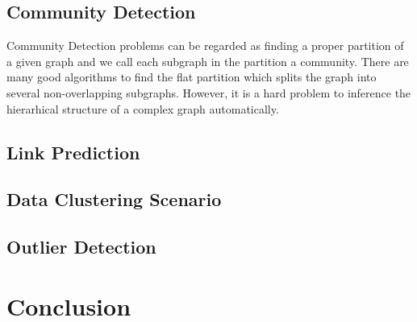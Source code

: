\subsection{Community Detection}\label{subsec:cd}
Community Detection problems can be regarded as finding a proper partition of a given graph and we call each subgraph in the partition a community. There are many good algorithms
to find the flat partition which splits the graph into several non-overlapping subgraphs. However, it is a hard problem to inference the hierarhical structure of a complex graph automatically.
\subsection{Link Prediction}
\subsection{Data Clustering Scenario}\label{subsec:dc}
\subsection{Outlier Detection}\label{subsec:od}
\section{Conclusion}\label{sec:conc}



%
%



%
%
\appendix
